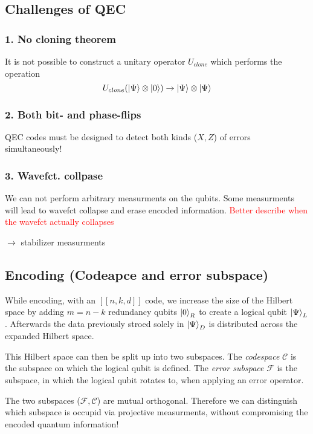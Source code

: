 \subsection{Challenges of QEC}
\subsubsection{1. No cloning theorem}
It is not possible to construct a unitary operator $U_{clone}$ which performs the operation
\begin{equation}
    U_{clone}(\ket{\Psi} \otimes \ket{0}) \rightarrow \ket{\Psi} \otimes\ket{\Psi}
\end{equation}

\subsubsection{2. Both bit- and phase-flips}
QEC codes must be designed to detect both kinds ($X,Z$) of errors simultaneously!

\subsubsection{3. Wavefct. collpase}
We can not perform arbitrary measurments on the qubits. 
Some measurments will lead to wavefct collapse and erase encoded information.
\textcolor{red}{Better describe when the wavefct actually collapses}

$\rightarrow$ stabilizer measurments

\subsection{Encoding (Codeapce and error subspace)}

While encoding, with an $[[n,k,d]]$ code, we increase the size of the Hilbert space by adding $m=n-k$ redundancy qubits $\ket{0}_R$
to create a logical qubit $\ket{\Psi}_L$. 
Afterwards the data previously stroed solely in $\ket{\Psi}_D$ is distributed across the expanded Hilbert space.

This Hilbert space can then be split up into two subspaces. 
The \textit{codespace} $\mathcal{C}$ is the subspace on which the logical qubit is defined.
The \textit{error subspace} $\mathcal{F}$ is the subspace, in which the logical qubit rotates to, when applying an error operator. 

The two subspaces ($\mathcal{F} , \mathcal{C}$) are mutual orthogonal. 
Therefore we can distinguish which subspace is occupid via projective measurments, 
without compromising the encoded quantum information! 

